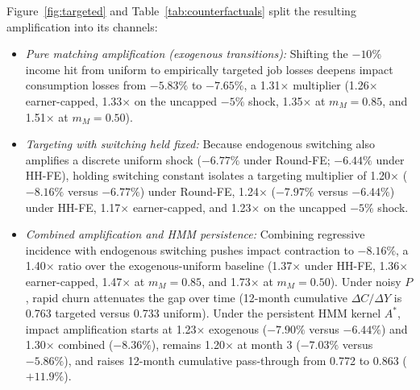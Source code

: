 \documentclass[11pt]{article}
\begin{document}
Figure~\ref{fig:targeted} and Table~\ref{tab:counterfactuals} split the resulting amplification into its channels:
\begin{itemize}
\item \textit{Pure matching amplification (exogenous transitions):} Shifting the $-10\%$ income hit from uniform to empirically targeted job losses deepens impact consumption losses from $-5.83\%$ to $-7.65\%$, a 1.31$\times$ multiplier (1.26$\times$ earner-capped, 1.33$\times$ on the uncapped $-5\%$ shock, 1.35$\times$ at $m_M = 0.85$, and 1.51$\times$ at $m_M = 0.50$).
\item \textit{Targeting with switching held fixed:} Because endogenous switching also amplifies a discrete uniform shock ($-6.77\%$ under Round-FE; $-6.44\%$ under HH-FE), holding switching constant isolates a targeting multiplier of 1.20$\times$ ($-8.16\%$ versus $-6.77\%$) under Round-FE, 1.24$\times$ ($-7.97\%$ versus $-6.44\%$) under HH-FE, 1.17$\times$ earner-capped, and 1.23$\times$ on the uncapped $-5\%$ shock.
\item \textit{Combined amplification and HMM persistence:} Combining regressive incidence with endogenous switching pushes impact contraction to $-8.16\%$, a 1.40$\times$ ratio over the exogenous-uniform baseline (1.37$\times$ under HH-FE, 1.36$\times$ earner-capped, 1.47$\times$ at $m_M = 0.85$, and 1.73$\times$ at $m_M = 0.50$). Under noisy $P$, rapid churn attenuates the gap over time (12-month cumulative $\Delta C / \Delta Y$ is 0.763 targeted versus 0.733 uniform). Under the persistent HMM kernel $A^*$, impact amplification starts at 1.23$\times$ exogenous ($-7.90\%$ versus $-6.44\%$) and 1.30$\times$ combined ($-8.36\%$), remains 1.20$\times$ at month 3 ($-7.03\%$ versus $-5.86\%$), and raises 12-month cumulative pass-through from 0.772 to 0.863 ($+11.9\%$).
\end{itemize}
\end{document}
